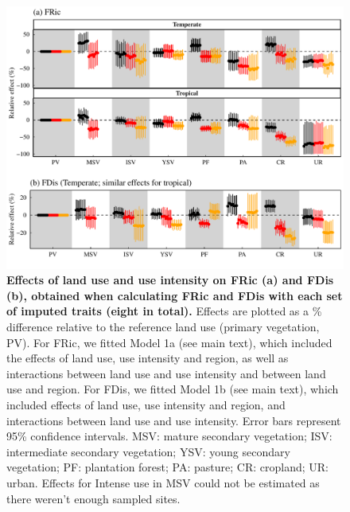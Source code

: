 \begin{figure}[h!]
\centering
\includegraphics[scale=0.7]{Supporting/Chapter3/Figures/Figure_SI_20}
\caption[Effects of land use and use intensity on FRic (a) and FDis (b), obtained when calculating FRic and FDis with each set of imputed traits]{\textbf{Effects of land use and use intensity on FRic (a) and FDis (b), obtained when calculating FRic and FDis with each set of imputed traits (eight in total).} Effects are plotted as a \% difference relative to the reference land use (primary vegetation, PV). For FRic, we fitted Model 1a (see main text), which included the effects of land use, use intensity and region, as well as interactions between land use and use intensity and between land use and region. For FDis, we fitted Model 1b (see main text), which included effects of land use, use intensity and region, and interactions between land use and use intensity. Error bars represent 95\% confidence intervals. MSV: mature secondary vegetation; ISV: intermediate secondary vegetation; YSV: young secondary vegetation; PF: plantation forest; PA: pasture; CR: cropland; UR: urban. Effects for Intense use in MSV could not be estimated as there weren’t enough sampled sites.}
\label{}
\end{figure}

